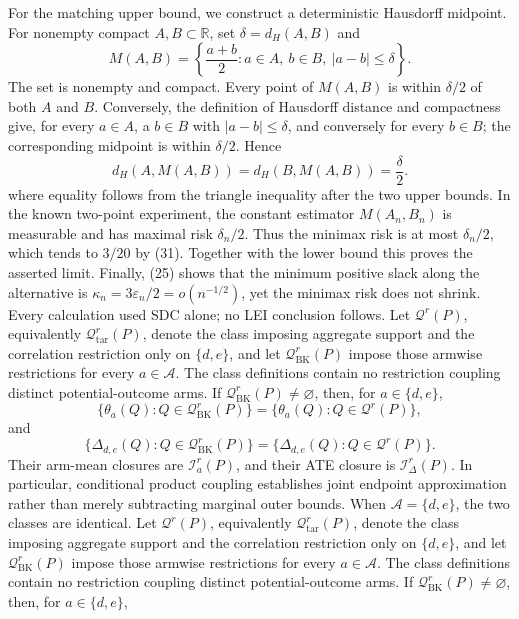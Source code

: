 For the matching upper bound, we construct a deterministic Hausdorff midpoint.  For nonempty compact \(A,B\subset\mathbb R\), set \(\delta=d_H(A,B)\) and
\[
 M(A,B)=\left\{\frac{a+b}{2}:a\in A,\ b\in B,\ |a-b|\le\delta\right\}.
\]
The set is nonempty and compact.  Every point of \(M(A,B)\) is within \(\delta/2\) of both \(A\) and \(B\).  Conversely, the definition of Hausdorff distance and compactness give, for every \(a\in A\), a \(b\in B\) with \(|a-b|\le\delta\), and conversely for every \(b\in B\); the corresponding midpoint is within \(\delta/2\).  Hence
\[
 d_H(A,M(A,B))=d_H(B,M(A,B))=\frac\delta2.                       \tag{34c}
\]
where equality follows from the triangle inequality after the two upper bounds.  In the known two-point experiment, the constant estimator \(M(A_n,B_n)\) is measurable and has maximal risk \(\delta_n/2\).  Thus the minimax risk is at most \(\delta_n/2\), which tends to \(3/20\) by (31).  Together with the lower bound this proves the asserted limit.  Finally, (25) shows that the minimum positive slack along the alternative is \(\kappa_n=3\varepsilon_n/2=o(n^{-1/2})\), yet the minimax risk does not shrink.  Every calculation used SDC alone; no LEI conclusion follows.
Let \(\mathcal Q^r(P)\), equivalently \(\mathcal Q_{\mathrm{tar}}^r(P)\), denote the class imposing aggregate support and the correlation restriction only on \(\{d,e\}\), and let \(\mathcal Q_{\mathrm{BK}}^r(P)\) impose those armwise restrictions for every \(a\in\mathcal A\).  The class definitions contain no restriction coupling distinct potential-outcome arms.  If \(\mathcal Q_{\mathrm{BK}}^r(P)\ne\varnothing\), then, for \(a\in\{d,e\}\),
\[
 \{\theta_a(Q):Q\in\mathcal Q_{\mathrm{BK}}^r(P)\}
 =\{\theta_a(Q):Q\in\mathcal Q^r(P)\},
\]
and
\[
 \{\Delta_{d,e}(Q):Q\in\mathcal Q_{\mathrm{BK}}^r(P)\}
 =\{\Delta_{d,e}(Q):Q\in\mathcal Q^r(P)\}.
\]
Their arm-mean closures are \(\mathcal I_a^r(P)\), and their ATE closure is \(\mathcal I_\Delta^r(P)\).  In particular, conditional product coupling establishes joint endpoint approximation rather than merely subtracting marginal outer bounds.  When \(\mathcal A=\{d,e\}\), the two classes are identical.
Let \(\mathcal Q^r(P)\), equivalently \(\mathcal Q_{\mathrm{tar}}^r(P)\), denote the class imposing aggregate support and the correlation restriction only on \(\{d,e\}\), and let \(\mathcal Q_{\mathrm{BK}}^r(P)\) impose those armwise restrictions for every \(a\in\mathcal A\).  The class definitions contain no restriction coupling distinct potential-outcome arms.  If \(\mathcal Q_{\mathrm{BK}}^r(P)\ne\varnothing\), then, for \(a\in\{d,e\}\),
